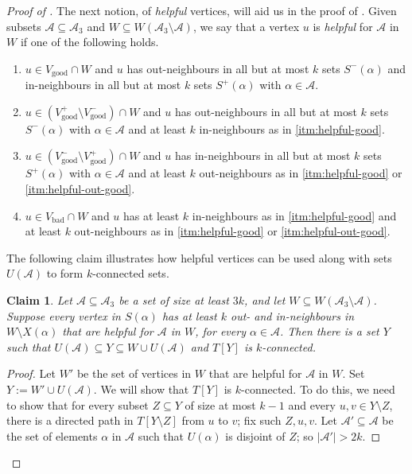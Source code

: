 \documentclass[english]{article}
\theoremstyle{plain}
\newtheorem{claim}[theorem]{Claim}
\theoremstyle{remark}
\def \Sp {S^+}
\def \Sm {S^-}
\def \Vgp {V_{\good}^+}
\def \Vgp {V_{\good}^+}
\def \Vgm {V_{\good}^-}
\def \Vg {V_{\good}}
\def \Vb {V_{\bad}}
\def \Vgm {V_{\good}^-}
\newcommand{\sm}{\setminus}
\newcommand{\A}{\mathcal{A}}
\DeclareMathOperator{\bad}{bad}
\DeclareMathOperator{\good}{good}
\begin{document}
\begin{proof}[Proof of ]
		The next notion, of \emph{helpful} vertices, will aid us in the proof of .
		Given subsets $\A \subseteq \A_3$ and $W \subseteq W(\A_3 \setminus \A)$, we say that a vertex $u$ is \emph{helpful} for $\A$ in $W$ if one of the following holds.
		\begin{enumerate}[label = \rm(H\arabic*)]
			\item \label{itm:helpful-good}
				$u \in \Vg \cap W$ and $u$ has out-neighbours in all but at most $k$ sets $\Sm(\alpha)$ and in-neighbours in all but at most $k$ sets $\Sp(\alpha)$ with $\alpha \in \A$.
			\item \label{itm:helpful-out-good}
				$u \in (\Vgp \setminus \Vgm) \cap W$ and $u$ has out-neighbours in all but at most $k$ sets $\Sm(\alpha)$ with $\alpha \in \A$ and at least $k$ in-neighbours as in \ref{itm:helpful-good}.
			\item \label{itm:helpful-in-good}
				$u \in (\Vgm \setminus \Vgp) \cap W$ and $u$ has in-neighbours in all but at most $k$ sets $\Sp(\alpha)$ with $\alpha \in \A$ and at least $k$ out-neighbours as in \ref{itm:helpful-good} or \ref{itm:helpful-out-good}.
			\item \label{itm:helpful-bad}
				$u \in \Vb \cap W$ and $u$ has at least $k$ in-neighbours as in \ref{itm:helpful-good} and at least $k$ out-neighbours as in \ref{itm:helpful-good} or \ref{itm:helpful-out-good}.
		\end{enumerate}

		The following claim illustrates how helpful vertices can be used along with sets $U(\A)$ to form $k$-connected sets.

		\begin{claim} \label{claim:helpful}
			Let $\A \subseteq \A_3$ be a set of size at least $3k$, and let $W \subseteq W(\A_3 \sm \A)$. Suppose every vertex in $S(\alpha)$ has at least $k$ out- and in-neighbours in $W \setminus X(\alpha)$ that are helpful for $\A$ in $W$, for every $\alpha \in \A$. Then there is a set $Y$ such that $U(\A) \subseteq Y \subseteq W \cup U(\A)$ and $T[Y]$ is $k$-connected.
		\end{claim}

		\begin{proof}
			Let $W'$ be the set of vertices in $W$ that are helpful for $\A$ in $W$. Set $Y := W' \cup U(\A)$. We will show that $T[Y]$ is $k$-connected.
			To do this, we need to show that for every subset $Z \subseteq Y$ of size at most $k-1$ and every $u, v \in Y \setminus Z$, there is a directed path in $T[Y \setminus Z]$ from $u$ to $v$; fix such $Z, u, v$. Let $\A' \subseteq \A$ be the set of elements $\alpha$ in $\A$ such that $U(\alpha)$ is disjoint of $Z$; so $|\A'| > 2k$. 


\end{proof}
\end{proof}
\end{document}
